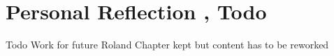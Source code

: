 \section{Personal Reflection , Todo}

Todo
Work for future Roland
Chapter kept but content has to be reworked

